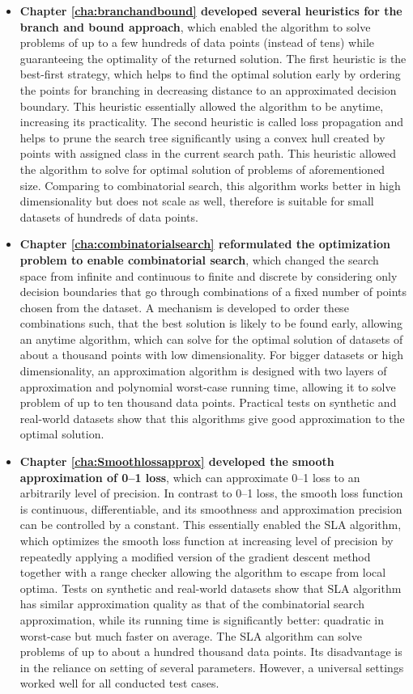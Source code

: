 \begin{itemize}

\item {\bf Chapter \ref{cha:branchandbound} developed several heuristics for the branch and bound approach}, which enabled the algorithm to solve problems of up to a few hundreds of data points (instead of tens) while guaranteeing the optimality of the returned solution. The first heuristic is the best-first strategy, which helps to find the optimal solution early by ordering the points for branching in decreasing distance to an approximated decision boundary. This heuristic essentially allowed the algorithm to be anytime, increasing its practicality. The second heuristic is called loss propagation and helps to prune the search tree significantly using a convex hull created by points with assigned class in the current search path. This heuristic allowed the algorithm to solve for optimal solution of problems of aforementioned size. Comparing to combinatorial search, this algorithm works better in high dimensionality but does not scale as well, therefore is suitable for small datasets of hundreds of data points. 
 
\item {\bf Chapter \ref{cha:combinatorialsearch} reformulated the optimization problem to enable combinatorial search}, which changed the search space from infinite and continuous to finite and discrete by considering only decision boundaries that go through combinations of a fixed number of points chosen from the dataset. A mechanism is developed to order these combinations such, that the best solution is likely to be found early, allowing an anytime algorithm, which can solve for the optimal solution of datasets of about a thousand points with low dimensionality. For bigger datasets or high dimensionality, an approximation algorithm is designed with two layers of approximation and polynomial worst-case running time, allowing it to solve problem of up to ten thousand data points. Practical tests on synthetic and real-world datasets show that this algorithms give good approximation to the optimal solution.  

\item {\bf Chapter \ref{cha:Smoothlossapprox} developed the smooth approximation of 0--1 loss}, which can approximate 0--1 loss to an arbitrarily level of precision. In contrast to 0--1 loss, the smooth loss function is continuous, differentiable, and its smoothness and approximation precision can be controlled by a constant. This essentially enabled the SLA algorithm, which optimizes the smooth loss function at increasing level of precision by repeatedly applying a modified version of the gradient descent method together with a range checker allowing the algorithm to escape from local optima. Tests on synthetic and real-world datasets show that SLA algorithm has similar approximation quality as that of the combinatorial search approximation, while its running time is significantly better: quadratic in worst-case but much faster on average. The SLA algorithm can solve problems of up to about a hundred thousand data points. Its disadvantage is in the reliance on setting of several parameters. However, a universal settings worked well for all conducted test cases.


\end{itemize}

